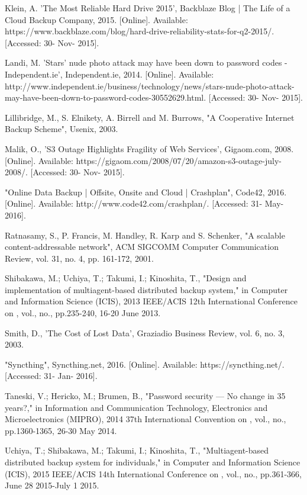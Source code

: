 \documentclass{scu-thesis}
\begin{document}
\begin{thebibliography}{9}
Klein, A. 'The Most Reliable Hard Drive 2015', Backblaze Blog | The Life of a Cloud Backup Company, 2015. [Online]. Available: https://www.backblaze.com/blog/hard-drive-reliability-stats-for-q2-2015/. [Accessed: 30- Nov- 2015].

Landi, M. 'Stars' nude photo attack may have been down to password codes - Independent.ie', Independent.ie, 2014. [Online]. Available: http://www.independent.ie/business/technology/news/stars-nude-photo-attack-may-have-been-down-to-password-codes-30552629.html. [Accessed: 30- Nov- 2015].

Lillibridge, M., S.  Elnikety, A.  Birrell and M.  Burrows, "A Cooperative Internet Backup Scheme", Usenix, 2003.

Malik, O., 'S3 Outage Highlights Fragility of Web Services', Gigaom.com, 2008. [Online]. Available: https://gigaom.com/2008/07/20/amazon-s3-outage-july-2008/. [Accessed: 30- Nov- 2015].

"Online Data Backup | Offsite, Onsite and Cloud | Crashplan", Code42, 2016. [Online]. Available: http://www.code42.com/crashplan/. [Accessed: 31- May- 2016].

Ratnasamy, S., P.  Francis, M.  Handley, R.  Karp and S.  Schenker, "A scalable content-addressable network", ACM SIGCOMM Computer Communication Review, vol. 31, no. 4, pp. 161-172, 2001.

Shibakawa, M.; Uchiya, T.; Takumi, I.; Kinoshita, T., "Design and implementation of multiagent-based distributed backup system," in Computer and Information Science (ICIS), 2013 IEEE/ACIS 12th International Conference on , vol., no., pp.235-240, 16-20 June 2013.

Smith, D., 'The Cost of Lost Data', Graziadio Business Review, vol. 6, no. 3, 2003.

"Syncthing", Syncthing.net, 2016. [Online]. Available: https://syncthing.net/. [Accessed: 31- Jan- 2016].

Taneski, V.; Hericko, M.; Brumen, B., "Password security — No change in 35 years?," in Information and Communication Technology, Electronics and Microelectronics (MIPRO), 2014 37th International Convention on , vol., no., pp.1360-1365, 26-30 May 2014.

Uchiya, T.; Shibakawa, M.; Takumi, I.; Kinoshita, T., "Multiagent-based distributed backup system for individuals," in Computer and Information Science (ICIS), 2015 IEEE/ACIS 14th International Conference on , vol., no., pp.361-366, June 28 2015-July 1 2015.


\end{thebibliography}
\end{document}
